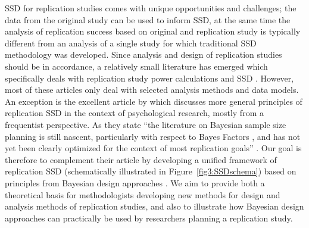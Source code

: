 SSD for replication studies comes with unique opportunities and challenges; the
data from the original study can be used to inform SSD, at the same time the
analysis of replication success based on original and replication study is
typically different from an analysis of a single study for which traditional SSD
methodology was developed. Since analysis and design of replication studies
should be in accordance, a relatively small literature has emerged which
specifically deals with replication study power calculations and SSD
\citep{Bayarri2002, Goodman1992, Senn2002, Anderson2017, Micheloud2020,
  vanZwet2022, Held2020, Pawel2022b, Hedges2021, Anderson2022}. However, most of
these articles only deal with selected analysis methods and data models. %
An exception is the excellent article by \citet{Anderson2022} which discusses
more general principles of replication SSD in the context of psychological
research, mostly from a frequentist perspective. As they state ``the literature
on Bayesian sample size planning is still nascent, particularly with respect to
Bayes Factors \citep{Schoenbrodt2017}, and has not yet been clearly optimized
for the context of most replication goals'' \citep[p. 18]{Anderson2022}. Our
goal is therefore to complement their article by developing a unified framework
of replication SSD (schematically illustrated in Figure~\ref{fig3:SSDschema})
based on principles from Bayesian design approaches \citep{Spiegelhalter1986b,
  Spiegelhalter1986c, Weiss1997, OHagan2001b, Gelfand2002, DeSantis2004,
  Spiegelhalter2004, Schoenbrodt2017, Pek2019, Kunzmann2021, Park2022,
  Grieve2022}. We aim to provide both a theoretical basis for methodologists
developing new methods for design and analysis methods of replication studies,
and also to illustrate how Bayesian design approaches can practically be used by
researchers planning a replication study.

